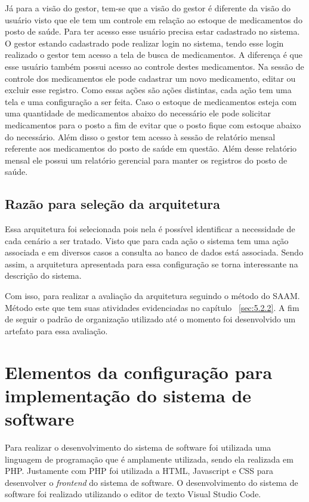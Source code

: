 Já para a visão do gestor, tem-se que a visão do gestor é diferente da visão do usuário visto que ele tem um controle em relação ao estoque de medicamentos do posto de saúde. Para ter acesso esse usuário precisa estar cadastrado no sistema. O gestor estando cadastrado pode realizar login no sistema, tendo esse login realizado o gestor tem acesso a tela de busca de medicamentos. A diferença é que esse usuário também possui acesso ao controle destes medicamentos.
Na sessão de controle dos medicamentos ele pode cadastrar um novo medicamento, editar ou excluir esse registro. Como essas ações são ações distintas, cada ação tem uma tela e uma configuração a ser feita.
Caso o estoque de medicamentos esteja com uma quantidade de medicamentos abaixo do necessário ele pode solicitar medicamentos para o posto a fim de evitar que o posto fique com estoque abaixo do necessário.
Além disso o gestor tem acesso à sessão de relatório mensal referente aos medicamentos do posto de saúde em questão.
Além desse relatório mensal ele possui um relatório gerencial para manter os registros do posto de saúde.

\subsection{Razão para seleção da arquitetura}

Essa arquitetura foi selecionada pois nela é possível identificar a necessidade de cada cenário a ser tratado. Visto que para cada ação o sistema tem uma ação associada e em diversos casos a consulta ao banco de dados está associada. Sendo assim, a arquitetura apresentada para essa configuração se torna interessante na descrição do sistema. 

Com isso, para realizar a avaliação da arquitetura seguindo o método do \acrfull{SAAM}. Método este que tem suas atividades evidenciadas no capítulo ~\ref{sec:5.2.2}. A fim de seguir o padrão de organização utilizado até o momento foi desenvolvido um artefato para essa avaliação.

\section{Elementos da configuração para implementação do sistema de software}

Para realizar o desenvolvimento do sistema de software foi utilizada uma linguagem de programação que é amplamente utilizada, sendo ela realizada em PHP. Justamente com PHP foi utilizada a \acrfull{HTML}, Javascript e \acrfull{CSS} para desenvolver o \emph{frontend} do sistema de software. O desenvolvimento do sistema de software foi realizado utilizando o editor de texto Visual Studio Code.

